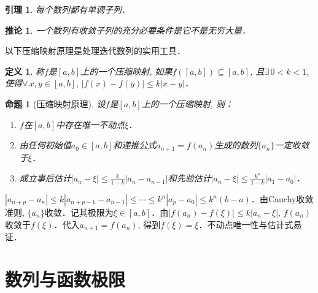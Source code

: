 \documentclass[11pt,a4paper]{ctexart}
\makeatletter
\theoremstyle{thmseries} %
\newtheorem{cor}{推论}[section]
\newtheorem{prop}{命题}[section]
\newtheorem{lem}{引理}[section]
\theoremstyle{exerseries}
\newtheorem{defn}{定义}[section]
\newtheorem{exer}{习题}[section]
\newtheorem*{rem}{注}
\renewenvironment{proof}[1][\proofname]{\par
  \pushQED{\qed}%
  \normalfont \topsep6\p@\@plus6\p@\relax
  \trivlist
  \item[\hskip\labelsep
        \itshape
    #1\@addpunct{}]\ignorespaces
}{%
  \popQED\endtrivlist\@endpefalse
}
\newenvironment{pf}{\begin{proof}[\bfseries\upshape 证\quad]}{\end{proof}}
\newcommand{\bra}[1]{\mathopen{}\left(#1\right)}
\makeatother
\begin{document}

\begin{lem}
	每个数列都有单调子列．
\end{lem}

\begin{cor}
	一个数列有收敛子列的充分必要条件是它不是无穷大量．
\end{cor}

以下压缩映射原理是处理迭代数列的实用工具．
\begin{defn}
	称$f$是$[a,b]$上的一个压缩映射, 如果$f\bra{[a,b]}\subseteq[a,b]$, 且$\exists\,0<k<1$, 使得$\forall\,x,y\in[a,b],\,|f(x)-f(y)|\leq k|x-y|$．
\end{defn}

\begin{prop}[压缩映射原理]
	设$f$是$[a,b]$上的一个压缩映射, 则：
	\begin{enumerate}
		\item $f$在$[a,b]$中存在唯一不动点$\xi$．
		\item 由任何初始值$a_0\in[a,b]$和递推公式$a_{n+1}=f(a_n)$生成的数列$\{a_n\}$一定收敛于$\xi$．
		\item 成立事后估计$|a_n-\xi|\leq\frac{k}{1-k}|a_n-a_{n-1}|$和先验估计$|a_n-\xi|\leq\frac{k^n}{1-k}|a_1-a_0|$．
	\end{enumerate}
\end{prop}
\begin{pf}
	$|a_{n+p}-a_n|\leq k|a_{n+p-1}-a_{n-1}|\leq\cdots\leq k^n|a_p-a_0|\leq k^n(b-a)$．由Cauchy收敛准则, $\{a_n\}$收敛．记其极限为$\xi\in[a,b]$．由$|f(a_n)-f(\xi)|\leq k|a_n-\xi|,\,f(a_n)$收敛于$f(\xi)$．代入$a_{n+1}=f(a_n)$, 得到$f(\xi)=\xi$．不动点唯一性与估计式易证．
\end{pf}



\section{数列与函数极限}
\end{document}
